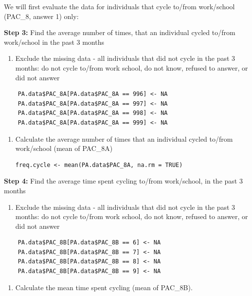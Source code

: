 \documentclass[]{book}
\providecommand{\tightlist}{%
  \setlength{\itemsep}{0pt}\setlength{\parskip}{0pt}}
\begin{document}
We will first evaluate the data for individuals that cycle to/from
work/school (PAC\_8, answer 1) only:

\textbf{Step 3:} Find the average number of times, that an individual
cycled to/from work/school in the past 3 months

\begin{enumerate}
\def\labelenumi{\alph{enumi}.}
\tightlist
\item
  Exclude the missing data - all individuals that did not cycle in the
  past 3 months: do not cycle to/from work school, do not know, refused
  to answer, or did not answer
\end{enumerate}

\begin{verbatim}
    PA.data$PAC_8A[PA.data$PAC_8A == 996] <- NA
    PA.data$PAC_8A[PA.data$PAC_8A == 997] <- NA
    PA.data$PAC_8A[PA.data$PAC_8A == 998] <- NA
    PA.data$PAC_8A[PA.data$PAC_8A == 999] <- NA
\end{verbatim}

\begin{enumerate}
\def\labelenumi{\alph{enumi}.}
\setcounter{enumi}{1}
\item
  Calculate the average number of times that an individual cycled
  to/from work/school (mean of PAC\_8A)

\begin{verbatim}
freq.cycle <- mean(PA.data$PAC_8A, na.rm = TRUE)
\end{verbatim}
\end{enumerate}

\textbf{Step 4:} Find the average time spent cycling to/from
work/school, in the past 3 months

\begin{enumerate}
\def\labelenumi{\alph{enumi}.}
\tightlist
\item
  Exclude the missing data - all individuals that did not cycle in the
  past 3 months: do not cycle to/from work school, do not know, refused
  to answer, or did not answer
\end{enumerate}

\begin{verbatim}
    PA.data$PAC_8B[PA.data$PAC_8B == 6] <- NA
    PA.data$PAC_8B[PA.data$PAC_8B == 7] <- NA
    PA.data$PAC_8B[PA.data$PAC_8B == 8] <- NA
    PA.data$PAC_8B[PA.data$PAC_8B == 9] <- NA
\end{verbatim}

\begin{enumerate}
\def\labelenumi{\alph{enumi}.}
\setcounter{enumi}{1}
\tightlist
\item
  Calculate the mean time spent cycling (mean of PAC\_8B).
\end{enumerate}
\end{document}
